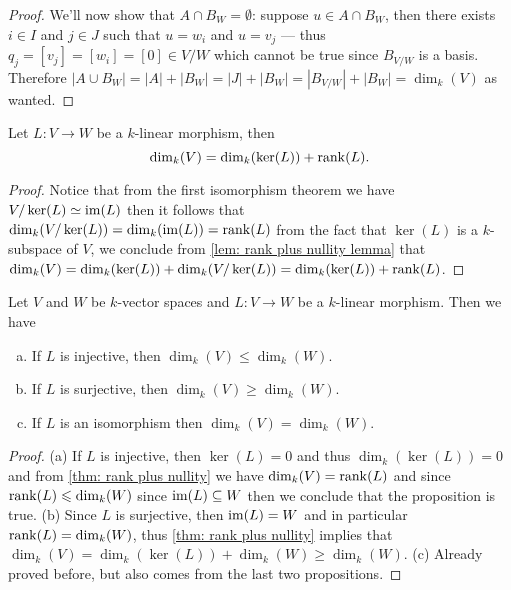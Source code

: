 \begin{proof}
We'll now show that \(A \cap B_W = \emptyset\): suppose \(u \in A \cap B_W\),
then there exists \(i \in I\) and \(j \in J\) such that \(u = w_i\) and \(u =
v_j\) --- thus \(q_j = [v_j] = [w_i] = [0] \in V/W\) which cannot be true since
\(B_{V/W}\) is a basis. Therefore \(|A \cup B_W| = |A| + |B_W| = |J| + |B_W| =
|B_{V/W}| + |B_W| = \dim_k(V)\) as wanted.
\end{proof}

\begin{theorem}\label{thm: rank plus nullity}
Let \(L : V \to W\) be a \(k\)-linear morphism, then
\[
  \dim_k(V) = \dim_k(\ker(L)) + \operatorname{rank}(L).
\]
\end{theorem}

\begin{proof}
Notice that from the first isomorphism theorem we have \(V/\ker(L) \simeq
\operatorname{im}(L)\) then it follows that \(\dim_k(V/\ker(L)) = \dim_k(\operatorname{im}(L)) =
\operatorname{rank}(L)\) from the fact that \(\ker(L)\) is a \(k\)-subspace of \(V\), we
conclude from \cref{lem: rank plus nullity lemma} that \(\dim_k(V) =
\dim_k(\ker(L)) + \dim_k(V/\ker(L)) = \dim_k(\ker(L)) + \operatorname{rank}(L)\).
\end{proof}

\begin{corollary}
Let \(V\) and \(W\) be \(k\)-vector spaces and \(L : V \to W\) be a
\(k\)-linear morphism. Then we have
\begin{enumerate}[(a).]
  \item If \(L\) is injective, then \(\dim_k(V) \leq \dim_k(W)\).
  \item If \(L\) is surjective, then \(\dim_k(V) \geq \dim_k(W)\).
  \item If \(L\) is an isomorphism then \(\dim_k(V) = \dim_k(W)\).
\end{enumerate}
\end{corollary}

\begin{proof}
(a) If \(L\) is injective, then \(\ker(L) = 0\) and thus \(\dim_k(\ker(L)) =
0\) and from \cref{thm: rank plus nullity} we have \(\dim_k(V) = \operatorname{rank}(L)\) and
since \(\operatorname{rank}(L) \leqslant \dim_k(W)\) since \(\operatorname{im}(L) \subseteq W\) then we
conclude that the proposition is true. (b) Since \(L\) is surjective, then
\(\operatorname{im}(L) = W\) and in particular \(\operatorname{rank}(L) = \dim_k(W)\), thus \cref{thm: rank
plus nullity} implies that  \(\dim_k(V) = \dim_k(\ker(L)) + \dim_k(W) \geq
\dim_k(W)\). (c) Already proved before, but also comes from the last two
propositions.
\end{proof}

